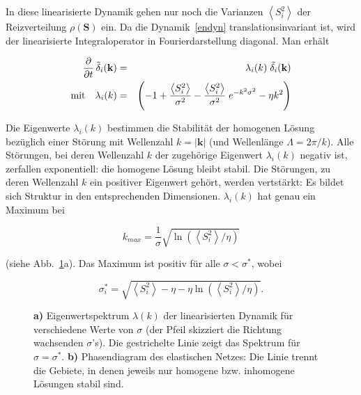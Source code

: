 In diese linearisierte Dynamik gehen nur noch die Varianzen
$\left<S_i^2\right>$ der Reizverteilung $\rho(\mathbf{S})$ ein. Da die
Dynamik~\eqref{endyn} translationsinvariant ist, wird der linearisierte
Integraloperator in Fourierdarstellung diagonal. Man erhält

\begin{eqnarray*}
    \frac{\partial}{\partial t}\,
    \Tilde{\delta}_i(\mathbf{k})&=& \lambda_i(k)\;
    \Tilde{\mathbf{\delta}_i}(\mathbf{k})\\
    \text{mit}\quad\lambda_i(k)&=&\left(-1+\frac{\left<S_i^2\right>}{\sigma^2}-
    \frac{\left<S_i^2\right>}{\sigma^2}\; e^{-k^2\sigma^2}-\eta
    k^2\right)\nonumber
\end{eqnarray*}

Die Eigenwerte $\lambda_i(k)$ bestimmen die Stabilität der homogenen
Lösung bezüglich einer Störung mit Wellenzahl $k = |\mathbf{k}|$ (und
Wellenlänge $\Lambda = 2 \pi / k$). Alle Störungen, bei deren Wellenzahl
$k$ der zugehörige Eigenwert $\lambda_i(k)$ negativ ist, zerfallen exponentiell: die homogene Lösung
bleibt stabil. Die Störungen, zu deren Wellenzahl $k$ ein positiver
Eigenwert gehört, werden vertstärkt: Es bildet sich Struktur in den
entsprechenden Dimensionen. $\lambda_i (k)$ hat genau ein Maximum bei

\begin{equation}
    k_{max}=\frac{1}{\sigma} \sqrt{\ln(\left<S_i^2\right>/\eta)}
    \label{kkrit}
\end{equation}

\noindent (siehe Abb.~\ref{spektrum}a). Das Maximum ist positiv für alle
$\sigma <\sigma^\ast$, wobei

\begin{equation}
    \sigma^\ast_i=\sqrt{\left<S_i^2\right>-\eta-\eta \ln(\left<S_i^2\right>/\eta)}.
    \label{sigkrit}
\end{equation}

\begin{figure}[t]
    \centering
    \caption{\textbf{a)} Eigenwertspektrum $\lambda(k)$
        der linearisierten Dynamik für verschiedene Werte von
        $\sigma$ (der Pfeil skizziert die Richtung wachsenden $\sigma$'s). Die
        gestrichelte Linie zeigt das Spektrum für $\sigma=\sigma^\ast$.
        \textbf{b)} Phasendiagram des elastischen Netzes: Die Linie
        trennt die Gebiete, in denen jeweils nur homogene bzw. inhomogene
        Lösungen stabil sind.}
    \label{spektrum}
\end{figure}

